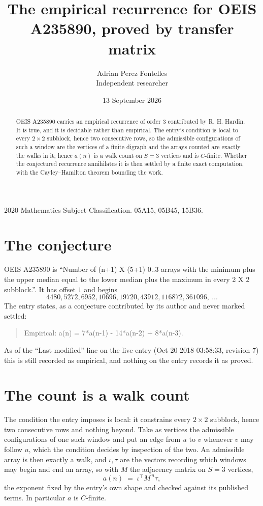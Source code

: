 \documentclass[11pt,a4paper]{article}
\title{The empirical recurrence for OEIS A235890, proved by transfer matrix}
\author{Adrian Perez Fontelles\\ \small Independent researcher}
\date{13 September 2026}
\theoremstyle{plain}
\theoremstyle{definition}
\begin{document}
\maketitle

\begin{abstract}
OEIS A235890 carries an empirical recurrence of order $3$ contributed by R. H. Hardin. It is
true, and it is decidable rather than empirical. The entry's condition is local to every $2\times2$ subblock, hence two consecutive rows, so
the admissible configurations of such a window are the vertices of a finite digraph and the
arrays counted are exactly the walks in it; hence $a(n)$ is a walk count on $S=3$ vertices
and is $C$-finite. Whether the conjectured recurrence annihilates it is then settled by a
finite exact computation, with the Cayley--Hamilton theorem bounding the work.
\end{abstract}

\noindent\small 2020 Mathematics Subject Classification. 05A15, 05B45, 15B36.\normalsize

\section{The conjecture}

OEIS A235890 is ``Number of (n+1) X (5+1) 0..3 arrays with the minimum plus the upper median equal to the lower median plus the maximum in every 2 X 2 subblock.''. It has offset $1$ and begins
\[
4480, 5272, 6952, 10696, 19720, 43912, 116872, 361096,\ \dots
\]
The entry states, as a conjecture contributed by its author and never marked settled:
\begin{quote}
Empirical: a(n) = 7*a(n-1) - 14*a(n-2) + 8*a(n-3).
\end{quote}
As of the ``Last modified'' line on the live entry (Oct 20 2018 03:58:33, revision 7) this is still
recorded as empirical, and nothing on the entry records it as proved.

\section{The count is a walk count}

The condition the entry imposes is local: it constrains every $2\times2$ subblock, hence two consecutive rows and nothing beyond. Take as vertices the admissible configurations of one such window and put an edge from $u$ to $v$ whenever $v$ may follow $u$, which the condition decides by inspection of the two.
An admissible array is then exactly a walk, and $\iota,\tau$ are the vectors recording which windows may begin and end an array, so with $M$ the adjacency matrix on $S=3$ vertices,
\[
a(n)\;=\;\iota^{\!\top}M^{\,n}\tau ,
\]
the exponent fixed by the entry's own shape and checked against its published terms. In
particular $a$ is $C$-finite.
\end{document}
